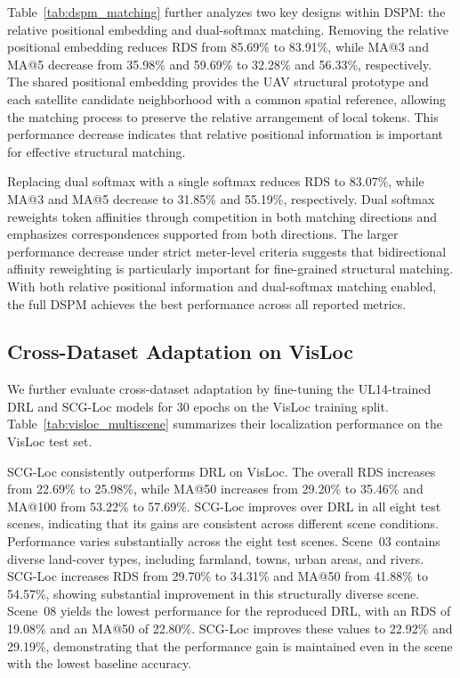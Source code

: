 \documentclass[runningheads]{llncs}
\begin{document}
Table~\ref{tab:dspm_matching} further analyzes two key designs within DSPM: the relative positional embedding and dual-softmax matching. Removing the relative positional embedding reduces RDS from 85.69\% to 83.91\%, while MA@3 and MA@5 decrease from 35.98\% and 59.69\% to 32.28\% and 56.33\%, respectively. The shared positional embedding provides the UAV structural prototype and each satellite candidate neighborhood with a common spatial reference, allowing the matching process to preserve the relative arrangement of local tokens. This performance decrease indicates that relative positional information is important for effective structural matching.

Replacing dual softmax with a single softmax reduces RDS to 83.07\%, while MA@3 and MA@5 decrease to 31.85\% and 55.19\%, respectively. Dual softmax reweights token affinities through competition in both matching directions and emphasizes correspondences supported from both directions. The larger performance decrease under strict meter-level criteria suggests that bidirectional affinity reweighting is particularly important for fine-grained structural matching. With both relative positional information and dual-softmax matching enabled, the full DSPM achieves the best performance across all reported metrics.

\subsection{Cross-Dataset Adaptation on VisLoc}
We further evaluate cross-dataset adaptation by fine-tuning the UL14-trained DRL and SCG-Loc models for 30 epochs on the VisLoc training split. Table~\ref{tab:visloc_multiscene} summarizes their localization performance on the VisLoc test set.                       

SCG-Loc consistently outperforms DRL on VisLoc. The overall RDS increases from 22.69\% to 25.98\%, while MA@50 increases from 29.20\% to 35.46\% and MA@100 from 53.22\% to 57.69\%. SCG-Loc improves over DRL in all eight test scenes, indicating that its gains are consistent across different scene conditions. Performance varies substantially across the eight test scenes. Scene~03 contains diverse land-cover types, including farmland, towns, urban areas, and rivers. SCG-Loc increases RDS from 29.70\% to 34.31\% and MA@50 from 41.88\% to 54.57\%, showing substantial improvement in this structurally diverse scene. Scene~08 yields the lowest performance for the reproduced DRL, with an RDS of 19.08\% and an MA@50 of 22.80\%. SCG-Loc improves these values to 22.92\% and 29.19\%, demonstrating that the performance gain is maintained even in the scene with the lowest baseline accuracy.
\end{document}
